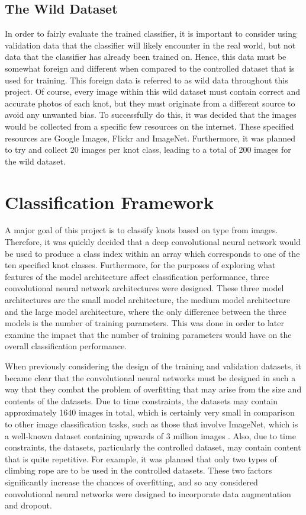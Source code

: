 \documentclass{l4proj}
\begin{document}
\subsection{The Wild Dataset}
In order to fairly evaluate the trained classifier, it is important to consider using validation data that the classifier will likely encounter in the real world, but not data that the classifier has already been trained on.
Hence, this data must be somewhat foreign and different when compared to the controlled dataset that is used for training.
This foreign data is referred to as wild data throughout this project.
Of course, every image within this wild dataset must contain correct and accurate photos of each knot, but they must originate from a different source to avoid any unwanted bias.
To successfully do this, it was decided that the images would be collected from a specific few resources on the internet.
These specified resources are Google Images, Flickr and ImageNet.
Furthermore, it was planned to try and collect 20 images per knot class, leading to a total of 200 images for the wild dataset.

\section{Classification Framework}
A major goal of this project is to classify knots based on type from images.
Therefore, it was quickly decided that a deep convolutional neural network would be used to produce a class index within an array which corresponds to one of the ten specified knot classes.
Furthermore, for the purposes of exploring what features of the model architecture affect classification performance, three convolutional neural network architectures were designed. 
These three model architectures are the small model architecture, the medium model architecture and the large model architecture, where the only difference between the three models is the number of training parameters.
This was done in order to later examine the impact that the number of training parameters would have on the overall classification performance.

When previously considering the design of the training and validation datasets, it became clear that the convolutional neural networks must be designed in such a way that they combat the problem of overfitting that may arise from the size and contents of the datasets.
Due to time constraints, the datasets may contain approximately 1640 images in total, which is certainly very small in comparison to other image classification tasks, such as those that involve ImageNet, which is a well-known dataset containing upwards of 3 million images \cite{imagenet_cvpr09}.
Also, due to time constraints, the datasets, particularly the controlled dataset, may contain content that is quite repetitive.
For example, it was planned that only two types of climbing rope are to be used in the controlled datasets.
These two factors significantly increase the chances of overfitting, and so any considered convolutional neural networks were designed to incorporate data augmentation and dropout.
\end{document}
